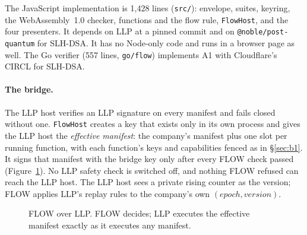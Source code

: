 \documentclass[10pt,twocolumn]{article}
\newcommand{\code}[1]{\texttt{#1}}
\begin{document}
The JavaScript implementation is 1{,}428 lines (\code{src/}): envelope, suites, keyring, the
WebAssembly~1.0 checker, functions and the flow rule, \code{FlowHost}, and the four presenters. It
depends on LLP at a pinned commit and on \code{@noble/post-quantum} for SLH-DSA. It has no
Node-only code and runs in a browser page as well. The Go verifier (557 lines,
\code{go/flow}) implements A1 with Cloudflare's CIRCL for SLH-DSA.

\paragraph{The bridge.} The LLP host verifies an LLP signature on every manifest and fails closed
without one. \code{FlowHost} creates a key that exists only in its own process and gives the LLP host
the \emph{effective manifest}: the company's manifest plus one slot per running function, with each
function's keys and capabilities fenced as in \S\ref{sec:b1}. It signs that manifest with the bridge
key only after every FLOW check passed (Figure~\ref{fig:bridge}). No LLP safety check is switched off,
and nothing FLOW refused can reach the LLP host. The LLP host sees a private rising counter as the
version; FLOW applies LLP's replay rules to the company's own $(\mathit{epoch},\mathit{version})$.

\begin{figure}[t]
\centering
{}
\caption{FLOW over LLP. FLOW decides; LLP executes the effective manifest exactly as it executes any manifest.}
\label{fig:bridge}
\end{figure}
\end{document}
